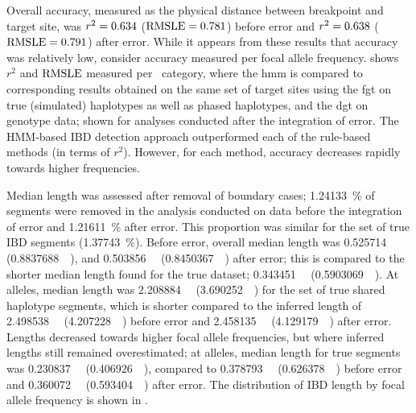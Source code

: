 %

%

Overall accuracy, measured as the physical distance between breakpoint and target site, was
${r^2=\dec{0.6340087}}$ (${\rmsle=\dec{0.7812424}}$) before error and
${r^2=\dec{0.6381827}}$ (${\rmsle=\dec{0.7911286}}$) after error.
While it appears from these results that accuracy was relatively low, consider accuracy measured per focal allele frequency.
 shows $r^2$ and $\operatorname*{RMSLE}$ measured per \fk{}~category, where the \gls{hmm} is compared to corresponding results obtained on the same set of target sites using the \gls{fgt} on true (simulated) haplotypes as well as phased haplotypes, and the \gls{dgt} on genotype data; shown for analyses conducted after the integration of error.
The HMM-based IBD detection approach outperformed each of the rule-based methods (in terms of $r^2$).
However, for each method, accuracy decreases rapidly towards higher frequencies.

%

%

Median length was assessed after removal of boundary cases;
\SI{1.24133}{\percent} of segments were removed in the analysis conducted on data before the integration of error and \SI{1.21611}{\percent} after error.
This proportion was similar for the set of true IBD segments (\SI{1.37743}{\percent}).
Before error, overall median length was
\SI{0.525714}{\mega\basepair} (\SI{0.8837688}{\centi\morgan}), and
\SI{0.503856}{\mega\basepair} (\SI{0.8450367}{\centi\morgan}) after error; this is compared to the shorter median length found for the true dataset;
\SI{0.343451}{\mega\basepair} (\SI{0.5903069}{\centi\morgan}).
At  alleles, median length was
\SI{2.208884}{\mega\basepair} (\SI{3.690252}{\centi\morgan}) for the set of true shared haplotype segments, which is shorter compared to the inferred length of
\SI{2.498538}{\mega\basepair} (\SI{4.207228}{\centi\morgan}) before error and
\SI{2.458135}{\mega\basepair} (\SI{4.129179}{\centi\morgan}) after error.
Lengths decreased towards higher focal allele frequencies, but where inferred lengths still remained overestimated; \eg at  alleles, median length for true segments was
\SI{0.230837}{\mega\basepair} (\SI{0.406926}{\centi\morgan}), compared to
\SI{0.378793}{\mega\basepair} (\SI{0.626378}{\centi\morgan}) before error and
\SI{0.360072}{\mega\basepair} (\SI{0.593404}{\centi\morgan}) after error.
The distribution of IBD length by focal allele frequency is shown in .


